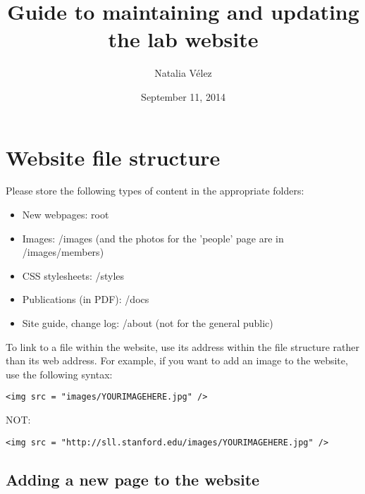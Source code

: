 \documentclass{article}
\author{Natalia V\'elez}
\title{Guide to maintaining and updating the lab website}
\date{September 11, 2014}
\begin{document}
\maketitle

\tableofcontents

\section{Website file structure}
Please store the following types of content in the appropriate folders:
\begin{itemize}
	\item New webpages: root
	\item Images: /images (and the photos for the 'people' page are in /images/members)
	\item CSS stylesheets: /styles
	\item Publications (in PDF): /docs
	\item Site guide, change log: /about (not for the general public) 
\end{itemize}

To link to a file within the website, use its address within the file structure rather than its web address. For example, if you want to add an image to the website, use the following syntax:

\begin{lstlisting}
<img src = "images/YOURIMAGEHERE.jpg" />
\end{lstlisting}

NOT:
\begin{lstlisting}
<img src = "http://sll.stanford.edu/images/YOURIMAGEHERE.jpg" />
\end{lstlisting}

\subsection{Adding a new page to the website}

\pagebreak
\end{document}
